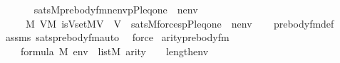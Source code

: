 \begin{isabellebody}
\ \ \isanewline
\ \ \ \ {\isachardoublequoteopen}sats{\isacharparenleft}{\kern0pt}M{\isacharcomma}{\kern0pt}prebody{\isacharunderscore}{\kern0pt}fm{\isacharparenleft}{\kern0pt}{\isasymphi}{\isacharcomma}{\kern0pt}nenv{\isacharparenright}{\kern0pt}{\isacharcomma}{\kern0pt}{\isacharbrackleft}{\kern0pt}{\isasymrho}{\isacharcomma}{\kern0pt}p{\isacharcomma}{\kern0pt}{\isasymalpha}{\isacharcomma}{\kern0pt}P{\isacharcomma}{\kern0pt}leq{\isacharcomma}{\kern0pt}one{\isacharbrackright}{\kern0pt}\ {\isacharat}{\kern0pt}\ nenv{\isacharparenright}{\kern0pt}\ {\isasymlongleftrightarrow}\isanewline
\ \ \ \ \ {\isacharparenleft}{\kern0pt}{\isasymexists}{\isasymtau}{\isasymin}M{\isachardot}{\kern0pt}\ {\isasymexists}V{\isasymin}M{\isachardot}{\kern0pt}\ is{\isacharunderscore}{\kern0pt}Vset{\isacharparenleft}{\kern0pt}{\isacharhash}{\kern0pt}{\isacharhash}{\kern0pt}M{\isacharcomma}{\kern0pt}{\isasymalpha}{\isacharcomma}{\kern0pt}V{\isacharparenright}{\kern0pt}\ {\isasymand}\ {\isasymtau}{\isasymin}V\ {\isasymand}\ sats{\isacharparenleft}{\kern0pt}M{\isacharcomma}{\kern0pt}forces{\isacharparenleft}{\kern0pt}{\isasymphi}{\isacharparenright}{\kern0pt}{\isacharcomma}{\kern0pt}{\isacharbrackleft}{\kern0pt}p{\isacharcomma}{\kern0pt}P{\isacharcomma}{\kern0pt}leq{\isacharcomma}{\kern0pt}one{\isacharcomma}{\kern0pt}{\isasymrho}{\isacharcomma}{\kern0pt}{\isasymtau}{\isacharbrackright}{\kern0pt}\ {\isacharat}{\kern0pt}\ nenv{\isacharparenright}{\kern0pt}{\isacharparenright}{\kern0pt}{\isachardoublequoteclose}\isanewline
%
\isadelimproof
\ \ %
\endisadelimproof
%
\isatagproof
{}\isamarkupfalse%
\ prebody{\isacharunderscore}{\kern0pt}fm{\isacharunderscore}{\kern0pt}def\ \isamarkupfalse%
\ assms\ sats{\isacharunderscore}{\kern0pt}prebody{\isacharunderscore}{\kern0pt}fm{\isacharunderscore}{\kern0pt}auto\ \isamarkupfalse%
\ force%
\endisatagproof
{\isafoldproof}%
%
\isadelimproof
\isanewline
%
\endisadelimproof
\isanewline
\isanewline
{}\isamarkupfalse%
\ arity{\isacharunderscore}{\kern0pt}prebody{\isacharunderscore}{\kern0pt}fm{\isacharcolon}{\kern0pt}\isanewline
\ \ \isanewline
\ \ \ \ {\isachardoublequoteopen}{\isasymphi}{\isasymin}formula{\isachardoublequoteclose}\ {\isachardoublequoteopen}{\isasymalpha}{\isasymin}M{\isachardoublequoteclose}\ {\isachardoublequoteopen}env\ {\isasymin}\ list{\isacharparenleft}{\kern0pt}M{\isacharparenright}{\kern0pt}{\isachardoublequoteclose}\ {\isachardoublequoteopen}arity{\isacharparenleft}{\kern0pt}{\isasymphi}{\isacharparenright}{\kern0pt}\ {\isasymle}\ {}\ {\isacharhash}{\kern0pt}{\isacharplus}{\kern0pt}\ length{\isacharparenleft}{\kern0pt}env{\isacharparenright}{\kern0pt}{\isachardoublequoteclose}\isanewline

\end{isabellebody}
